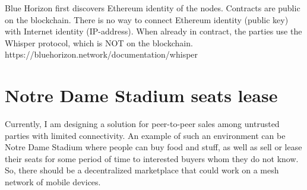 \documentclass{article}
\begin{document}
Blue Horizon first discovers Ethereum identity of the nodes. Contracts are public on the blockchain. There is no way to connect Ethereum identity (public key) with Internet identity (IP-address). When already in contract, the parties use the Whisper protocol, which is NOT on the blockchain. https://bluehorizon.network/documentation/whisper 

\section{Notre Dame Stadium seats lease}
Currently, I am designing a solution for peer-to-peer sales among untrusted parties with limited connectivity. An example of such an environment can be Notre Dame Stadium where people can buy food and stuff, as well as sell or lease their seats for some period of time to interested buyers whom they do not know. So, there should be a decentralized marketplace that could work on a mesh network of mobile devices.


\nocite{*}



\end{document}
